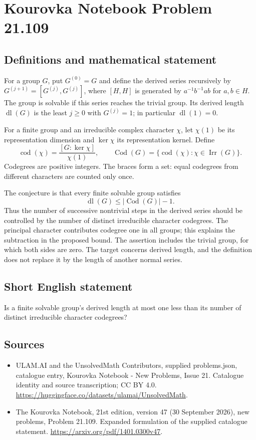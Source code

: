 \documentclass[11pt,a4paper]{article}
\begin{document}
\section*{Kourovka Notebook Problem 21.109}\label{statement}

\subsection{Definitions and mathematical statement}
For a group $G$, put $G^{(0)}=G$ and define the derived series recursively by $G^{(j+1)}=[G^{(j)},G^{(j)}]$, where $[H,H]$ is generated by $a^{-1}b^{-1}ab$ for $a,b\in H$. The group is solvable if this series reaches the trivial group. Its derived length $\operatorname{dl}(G)$ is the least $j\ge0$ with $G^{(j)}=1$; in particular $\operatorname{dl}(1)=0$.

For a finite group and an irreducible complex character $\chi$, let $\chi(1)$ be its representation dimension and $\ker\chi$ its representation kernel. Define
\[
 \operatorname{cod}(\chi)=\frac{[G:\ker\chi]}{\chi(1)},\qquad
 \operatorname{Cod}(G)=\{\operatorname{cod}(\chi):\chi\in\operatorname{Irr}(G)\}.
\]
Codegrees are positive integers. The braces form a set: equal codegrees from different characters are counted only once.

The conjecture is that every finite solvable group satisfies
\[
 \operatorname{dl}(G)\le|\operatorname{Cod}(G)|-1.
\]
Thus the number of successive nontrivial steps in the derived series should be controlled by the number of distinct irreducible character codegrees. The principal character contributes codegree one in all groups; this explains the subtraction in the proposed bound. The assertion includes the trivial group, for which both sides are zero. The target concerns derived length, and the definition does not replace it by the length of another normal series.
\subsection{Short English statement}
Is a finite solvable group’s derived length at most one less than its number of distinct irreducible character codegrees?
\subsection{Sources}
\begin{itemize}
\item[S1] ULAM.AI and the UnsolvedMath Contributors, supplied problems.json, catalogue entry, Kourovka Notebook - New Problems, Issue 21. Catalogue identity and source transcription; CC BY 4.0.
\url{https://huggingface.co/datasets/ulamai/UnsolvedMath}.
\item[S2] The Kourovka Notebook, 21st edition, version 47 (30 September 2026), new problems, Problem 21.109. Expanded formulation of the supplied catalogue statement.
\url{https://arxiv.org/pdf/1401.0300v47}.
\end{itemize}
\end{document}
